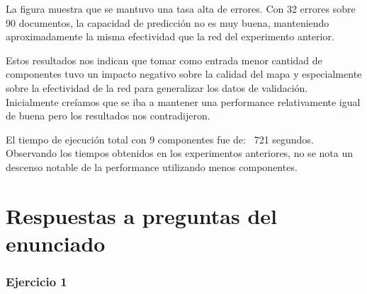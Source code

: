 La figura muestra que se mantuvo una tasa alta de errores. Con 32 errores sobre 90 documentos, la capacidad de predicción no es muy buena, manteniendo aproximadamente la misma efectividad que la red del experimento anterior.

Estos resultados nos indican que tomar como entrada menor cantidad de componentes tuvo un impacto negativo sobre la calidad del mapa y especialmente sobre la efectividad de la red para generalizar los datos de validación. Inicialmente creíamos que se iba a mantener una performance relativamente igual de buena pero los resultados nos contradijeron.

El tiempo de ejecución total con 9 componentes fue de: ~721 segundos. Observando los tiempos obtenidos en los experimentos anteriores, no se nota un descenso notable de la performance utilizando menos componentes.

\newpage
\section{Respuestas a preguntas del enunciado}

\subsubsection{Ejercicio 1}


